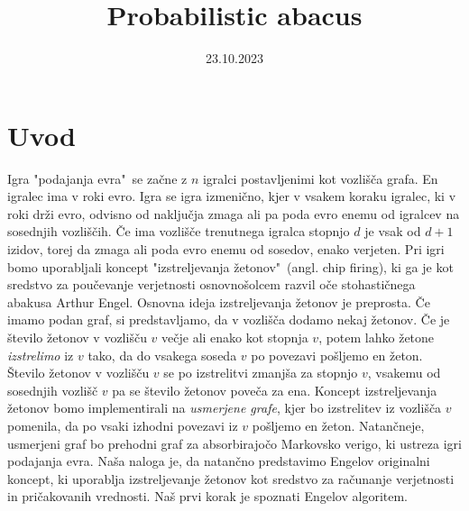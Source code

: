 \documentclass[twoside,11pt]{article}
\begin{document}



\date{23.10.2023}

\klasifikacija{~} 
\title{Probabilistic abacus}

\glava
\baselineskip=14.5pt

\smallskip

\section{Uvod}
Igra "podajanja evra" \,se začne z $n$ igralci postavljenimi kot vozlišča grafa. En igralec ima v roki evro. Igra se igra izmenično, kjer v vsakem koraku igralec, ki v roki drži evro, odvisno od naključja zmaga ali pa poda evro enemu od igralcev na sosednjih vozliščih. Če ima vozlišče trenutnega igralca stopnjo $d$ je vsak od $d + 1$ izidov, torej da zmaga ali poda evro enemu od sosedov, enako verjeten. Pri igri bomo uporabljali koncept "izstreljevanja žetonov" \,(angl. chip firing), ki ga je kot sredstvo za poučevanje verjetnosti osnovnošolcem razvil oče stohastičnega abakusa Arthur Engel.
Osnovna ideja izstreljevanja žetonov je preprosta. Če imamo podan graf, si predstavljamo, da v vozlišča dodamo nekaj žetonov. Če je število žetonov v vozlišču $v$ večje ali enako kot stopnja $v$, potem lahko žetone \emph{izstrelimo} iz $v$ tako, da do vsakega soseda $v$ po povezavi pošljemo en žeton. Število žetonov v vozlišču $v$ se po izstrelitvi zmanjša za stopnjo $v$, vsakemu od sosednjih vozlišč $v$ pa se število žetonov poveča za ena. 
Koncept izstreljevanja žetonov bomo implementirali na \emph{usmerjene grafe}, kjer bo izstrelitev iz vozlišča $v$ pomenila, da po vsaki izhodni povezavi iz $v$ pošljemo en žeton. Natančneje, usmerjeni graf bo prehodni graf za absorbirajočo Markovsko verigo, ki ustreza igri podajanja evra. Naša naloga je, da natančno predstavimo Engelov originalni koncept, ki uporablja izstreljevanje žetonov kot sredstvo za računanje verjetnosti in pričakovanih vrednosti. Naš prvi korak je spoznati Engelov algoritem.
\end{document}
